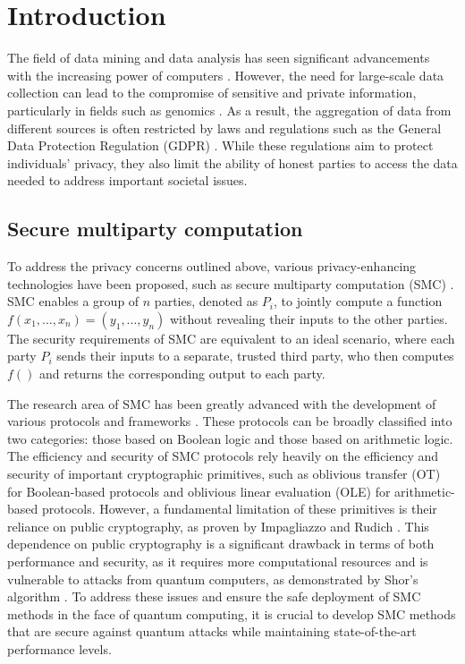 


%

\chapter{Introduction}

The field of data mining and data analysis has seen significant advancements with the increasing power of computers \cite{Wang11}. However, the need for large-scale data collection can lead to the compromise of sensitive and private information, particularly in fields such as genomics \cite{NS08, L02, Homer08, Gymrek13}. As a result, the aggregation of data from different sources is often restricted by laws and regulations such as the General Data Protection Regulation (GDPR) \cite{EUdataregulations2016}. While these regulations aim to protect individuals' privacy, they also limit the ability of honest parties to access the data needed to address important societal issues.

\section*{Secure multiparty computation}


To address the privacy concerns outlined above, various privacy-enhancing technologies have been proposed, such as secure multiparty computation (SMC) \cite{Li2016, Armknecht2015, Yao82}. SMC enables a group of $n$ parties, denoted as $P_i$, to jointly compute a function $f( x_1, ..., x_n ) = (y_1, ..., y_n)$ without revealing their inputs to the other parties. The security requirements of SMC are equivalent to an ideal scenario, where each party $P_i$ sends their inputs to a separate, trusted third party, who then computes $f()$ and returns the corresponding output to each party.

The research area of SMC has been greatly advanced with the development of various protocols and frameworks \cite{Goldreich87, Bendlin11, D12}. These protocols can be broadly classified into two categories: those based on Boolean logic and those based on arithmetic logic. The efficiency and security of SMC protocols rely heavily on the efficiency and security of important cryptographic primitives, such as oblivious transfer (OT) for Boolean-based protocols and oblivious linear evaluation (OLE) for arithmetic-based protocols. However, a fundamental limitation of these primitives is their reliance on public cryptography, as proven by Impagliazzo and Rudich \cite{IR99}. This dependence on public cryptography is a significant drawback in terms of both performance and security, as it requires more computational resources and is vulnerable to attacks from quantum computers, as demonstrated by Shor's algorithm \cite{Sho95}. To address these issues and ensure the safe deployment of SMC methods in the face of quantum computing, it is crucial to develop SMC methods that are secure against quantum attacks while maintaining state-of-the-art performance levels.


